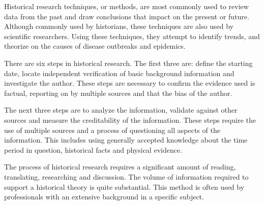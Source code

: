 \documentclass[12pt, a4paper]{report}
\begin{document}
Historical research techniques, or methods, are most commonly used to review data from the past and draw conclusions that impact on the present or future. Although commonly used by historians, these techniques are also used by scientific researchers. Using these techniques, they attempt to identify trends, and theorize on the causes of disease outbreaks and epidemics.


There are six steps in historical research. The first three are: define the starting date, locate independent verification of basic background information and investigate the author. These steps are necessary to confirm the evidence used is factual, reporting on by multiple sources and that the bias of the author.

The next three steps are to analyze the information, validate against other sources and measure the creditability of the information. These steps require the use of multiple sources and a process of questioning all aspects of the information. This includes using generally accepted knowledge about the time period in question, historical facts and physical evidence.

The process of historical research requires a significant amount of reading, translating, researching and discussion. The volume of information required to support a historical theory is quite substantial. This method is often used by professionals with an extensive background in a specific subject.
\end{document}
